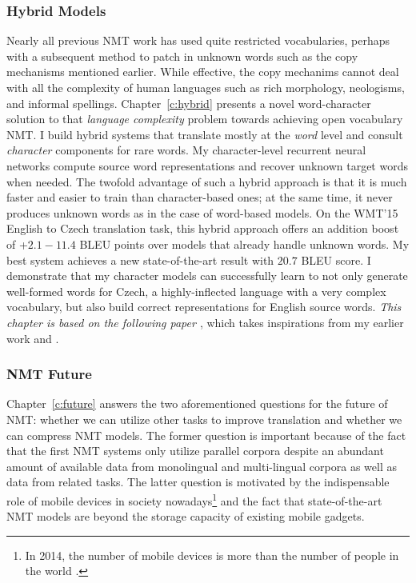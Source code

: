 \subsubsection{Hybrid Models} 
Nearly all previous NMT work has used quite restricted
vocabularies, perhaps with a subsequent method to patch in unknown words such as
the copy mechanisms mentioned earlier. While effective, the copy mechanims cannot deal with all the
complexity of human languages such as rich morphology, neologisms, and informal
spellings.
Chapter~\ref{c:hybrid} presents a novel word-character solution to that {\it
language complexity} problem towards achieving
open vocabulary NMT.
I build hybrid systems that translate mostly at the {\it word}
level and consult {\it character} components for rare words. 
My character-level recurrent neural networks compute source
word representations and recover unknown target words when needed.
The twofold advantage of such a hybrid approach is that it is much faster and easier to
train than character-based ones; at the same time, it never produces unknown words as in the case of word-based models. 
On the WMT'15 English to Czech translation task, 
this hybrid approach offers an addition boost of +$2.1{-}11.4$ BLEU points over models 
that already handle unknown words. 
My best system achieves a new state-of-the-art result with
$20.7$ BLEU score.
I demonstrate that my character models can successfully learn to not only generate well-formed words for Czech, a
highly-inflected language with a very complex vocabulary, but also build correct
representations for English source words.
{\it This chapter is based on the following paper \cite{luong16}}, which takes inspirations from my earlier work \cite{luong13} and \cite{li15}.

\subsubsection{NMT Future} 
Chapter~\ref{c:future} answers the two aforementioned questions
for the future of NMT: whether we can utilize other tasks to improve
translation and whether we can compress NMT models. 
The former question is important because of the fact that the first NMT systems only
utilize parallel corpora despite an abundant amount of available data from
monolingual and multi-lingual corpora as well as data from related tasks. The
latter question is motivated by the indispensable role of mobile devices in 
society nowadays\footnote{In 2014, the number of mobile devices is more than the number
of people in the world \cite{mobiledevices}.} 
and the fact that state-of-the-art NMT models are beyond the storage capacity of
existing mobile gadgets.

